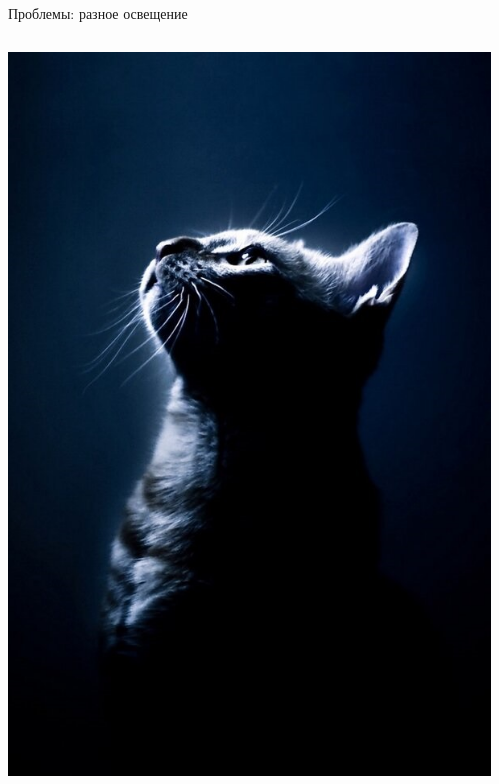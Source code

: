 \documentclass[aspectratio=169, professionalfonts]{beamer}
\begin{document}
\begin{frame}{Проблемы: разное освещение}
\begin{columns}
\begin{column}{.325\linewidth}
            \includegraphics[width=\linewidth]{graphs/fig12_2.jpg}
        \end{column}
        \begin{column}{.325\linewidth}
            \centering

\end{column}
\end{columns}
\end{frame}
\end{document}
